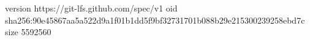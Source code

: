 version https://git-lfs.github.com/spec/v1
oid sha256:90e45867aa5a522d9a1f01b1dd5f9bf32731701b088b29e215300239258ebd7c
size 5592560
